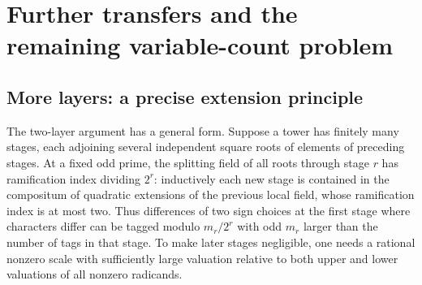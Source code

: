 \documentclass[11pt]{article}
\begin{document}
\section{Further transfers and the remaining variable-count problem}
\subsection{More layers: a precise extension principle}
The two-layer argument has a general form. Suppose a tower has finitely
many stages, each adjoining several independent square roots of elements
of preceding stages. At a fixed odd prime, the splitting field of
all roots through stage $r$ has ramification index dividing $2^r$:
inductively each new stage is contained in the compositum of quadratic
extensions of the previous local field, whose ramification index is
at most two. Thus differences of two sign choices at the first stage
where characters differ can be tagged modulo $m_r/2^r$ with odd
$m_r$ larger than the number of tags in that stage. To make later
stages negligible, one needs a rational nonzero scale with sufficiently
large valuation relative to both upper and lower valuations of all
nonzero radicands.
\end{document}

